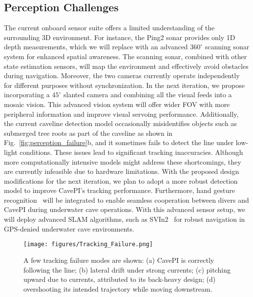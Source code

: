 \subsection{Perception Challenges}
The current onboard sensor suite offers a limited understanding of the surrounding 3D environment. For instance, the Ping2 sonar provides only 1D depth measurements, which we will replace with an advanced $360^\circ$ scanning sonar system for enhanced spatial awareness. The scanning sonar, combined with other state estimation sensors, will map the environment and effectively avoid obstacles during navigation. Moreover, the two cameras currently operate independently for different purposes without synchronization. In the next iteration, we propose incorporating a $45^\circ$ slanted camera and combining all the visual feeds into a mosaic vision. This advanced vision system will offer wider FOV with more peripheral information and improve visual servoing performance. Additionally, the current caveline detection model occasionally misidentifies objects such as submerged tree roots as part of the caveline as shown in Fig.~\ref{fig:perception_failure}b, and it sometimes fails to detect the line under low-light conditions. These issues lead to significant tracking inaccuracies. Although more computationally intensive models might address these shortcomings, they are currently infeasible due to hardware limitations. With the proposed design modifications for the next iteration, we plan to adopt a more robust detection model to improve CavePI's tracking performance. Furthermore, hand gesture recognition~\cite{xu2008natural} will be integrated to enable seamless cooperation between divers and CavePI during underwater cave operations. With this advanced sensor setup, we will deploy advanced SLAM algorithms, such as SVIn2~\cite{rahman2022svin2} for robust navigation in GPS-denied underwater cave environments. 



\begin{figure}[h]
    \centering
    \texttt{[image: figures/Tracking\_Failure.png]}%
    \caption{A few tracking failure modes are shown: (a) CavePI is correctly following the line; (b) lateral drift under strong currents; (c) pitching upward due to currents, attributed to its back-heavy design; (d) overshooting its intended trajectory while moving downstream.
    }%
    \vspace{-2mm}
    \label{fig:tracking_failure}
\end{figure}


